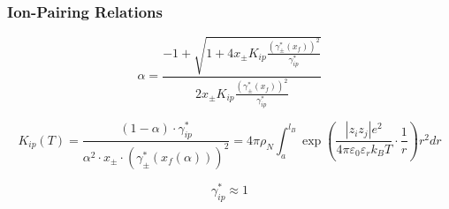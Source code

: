 \documentclass[12pt, letterpaper]{article}
\begin{document}
\subsubsection{Ion-Pairing Relations}


\begin{equation}
    \alpha=\frac{-1+\sqrt{1+4x_{\pm} K_{ip}\frac{\left(\gamma_{\pm}^*\left(x_{f}\right)\right)^2}{\gamma_{ip}^*}}}{2x_{\pm} K_{ip}\frac{\left(\gamma_{\pm}^*\left(x_{f}\right)\right)^2}{\gamma_{ip}^*}}
    \label{eq:alpha_ion_pair}
\end{equation}


\begin{equation}
    K_{ip}(T)=\frac{(1-\alpha)\cdot\gamma_{ip}^{*}}{\alpha^{2}\cdot x_{\pm}\cdot\left(\gamma_{\pm}^{*}(x_{f}(\alpha))\right)^{2}} = 4\pi\rho_{N}\int_{a}^{l_{B}}\exp\left(\frac{\left|z_{i}z_{j}\right|e^2}{4\pi\varepsilon_{0}\varepsilon_{r}k_{B}T}\cdot\frac{1}{r}\right)r^2dr
    \label{eq:k_ion_pair}
\end{equation}


\begin{equation}
    \gamma_{ip}^* \approx 1
    \label{eq:gamma_ion_pair_unity}
\end{equation}

\end{document}

